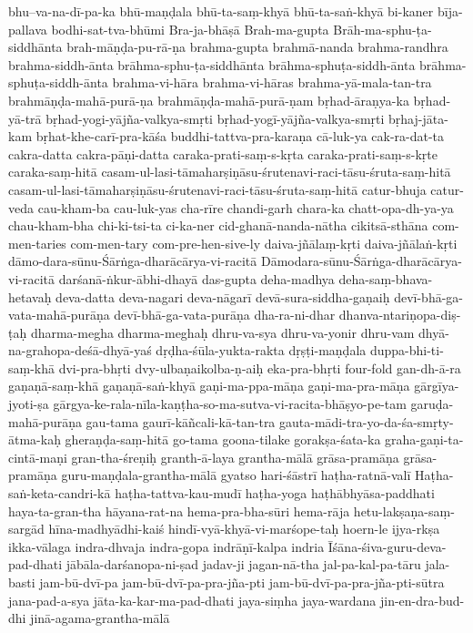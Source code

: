 {bhu--va-na-dī-pa-ka
bhū-maṇḍala
bhū-ta-saṃ-khyā
bhū-ta-saṅ-khyā
bi-kaner
bīja-pallava
bodhi-sat-tva-bhūmi
Bra-ja-bhāṣā
Brah-ma-gupta
Brāh-ma-sphu-ṭa-siddhānta
brah-māṇḍa-pu-rā-ṇa
brahma-gupta
brahmā-nanda
brahma-randhra
brahma-siddh-ānta
brāhma-sphu-ṭa-siddhānta
brāhma-sphuṭa-siddh-ānta
brāhma-sphuṭa-siddh-ānta
brahma-vi-hāra
brahma-vi-hāras
brahma-yā-mala-tan-tra
brahmāṇḍa-mahā-purā-ṇa
brahmāṇḍa-mahā-purā-ṇam
bṛhad-āraṇya-ka
bṛhad-yā-trā
bṛhad-yogi-yājña-valkya-smṛti
bṛhad-yogī-yājña-valkya-smṛti
bṛhaj-jāta-kam
bṛhat-khe-carī-pra-kāśa
buddhi-tattva-pra-karaṇa
cā-luk-ya
cak-ra-dat-ta
cakra-datta
cakra-pāṇi-datta
caraka-prati-saṃ-s-kṛta
caraka-prati-saṃ-s-kṛte
caraka-saṃ-hitā
casam-ul-lasi-tāmaharṣiṇāsu-śrutenavi-raci-tāsu-śruta-saṃ-hitā
casam-ul-lasi-tāmaharṣiṇāsu-śrutenavi-raci-tāsu-śruta-saṃ-hitā
catur-bhuja
catur-veda
cau-kham-ba
cau-luk-yas
cha-rīre
chandi-garh
chara-ka
chatt-opa-dh-ya-ya
chau-kham-bha
chi-ki-tsi-ta
ci-ka-ner
cid-ghanā-nanda-nātha
cikitsā-sthāna
com-men-taries
com-men-tary
com-pre-hen-sive-ly
daiva-jñālaṃ-kṛti
daiva-jñālaṅ-kṛti
dāmo-dara-sūnu-Śārṅga-dharācārya-vi-racitā
Dāmodara-sūnu-Śārṅga-dharācārya-vi-racitā
darśanā-ṅkur-ābhi-dhayā
das-gupta
deha-madhya
deha-saṃ-bhava-hetavaḥ
deva-datta
deva-nagari
deva-nāgarī
devā-sura-siddha-gaṇaiḥ
devī-bhā-ga-vata-mahā-purāṇa
devī-bhā-ga-vata-purāṇa
dha-ra-ni-dhar
dhanva-ntariṇopa-diṣ-ṭaḥ
dharma-megha
dharma-meghaḥ
dhru-va-sya
dhru-va-yonir
dhru-vam
dhyā-na-grahopa-deśā-dhyā-yaś
dṛḍha-śūla-yukta-rakta
dṛṣṭi-maṇḍala
duppa-bhi-ti-saṃ-khā
dvi-pra-bhṛti
dvy-ulbaṇaikolba-ṇ-aiḥ
eka-pra-bhṛti
four-fold
gan-dh-ā-ra
gaṇaṇā-saṃ-khā
gaṇaṇā-saṅ-khyā
gaṇi-ma-ppa-māṇa
gaṇi-ma-pra-māṇa
gārgīya-jyoti-ṣa
gārgya-ke-rala-nīla-kaṇṭha-so-ma-sutva-vi-racita-bhāṣyo-pe-tam
garuḍa-mahā-purāṇa
gau-tama
gaurī-kāñcali-kā-tan-tra
gauta-mādi-tra-yo-da-śa-smṛty-ātma-kaḥ
gheraṇḍa-saṃ-hitā
go-tama
goona-tilake
gorakṣa-śata-ka
graha-gaṇi-ta-cintā-maṇi
gran-tha-śreṇiḥ
granth-ā-laya
grantha-mālā
grāsa-pramāṇa
grāsa-pramāṇa
guru-maṇḍala-grantha-mālā
gyatso
hari-śāstrī
haṭha-ratnā-valī
Haṭha-saṅ-keta-candri-kā
haṭha-tattva-kau-mudī
haṭha-yoga
haṭhābhyāsa-paddhati
haya-ta-gran-tha
hāyana-rat-na
hema-pra-bha-sūri
hema-rāja
hetu-lakṣaṇa-saṃ-sargād
hīna-madhyādhi-kaiś
hindī-vyā-khyā-vi-marśope-taḥ
hoern-le
ijya-rkṣa
ikka-vālaga
indra-dhvaja
indra-gopa
indrāṇī-kalpa
indria
Īśāna-śiva-guru-deva-pad-dhati
jābāla-darśanopa-ni-ṣad
jadav-ji
jagan-nā-tha
jal-pa-kal-pa-tāru
jala-basti
jam-bū-dvī-pa
jam-bū-dvī-pa-pra-jña-pti
jam-bū-dvī-pa-pra-jña-pti-sūtra
jana-pad-a-sya
jāta-ka-kar-ma-pad-dhati
jaya-siṃha
jaya-wardana
jin-en-dra-bud-dhi
jinā-agama-grantha-mālā
}
